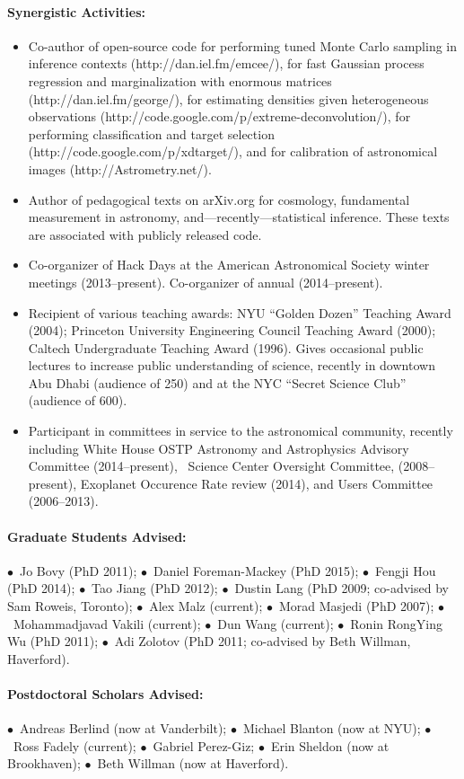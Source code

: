 \documentclass[12pt]{article}
\begin{document}
\paragraph{Synergistic Activities:}
\begin{itemize}\setlength{\itemsep}{0pt}
\item
Co-author of open-source code
for performing tuned Monte Carlo sampling in inference contexts (http://dan.iel.fm/emcee/),
for fast Gaussian process regression and marginalization with enormous matrices (http://dan.iel.fm/george/),
for estimating densities given heterogeneous observations (http://code.google.com/p/extreme-deconvolution/),
for performing classification and target selection (http://code.google.com/p/xdtarget/),
and
for calibration of astronomical images (http://Astrometry.net/).
\item
Author of pedagogical texts on arXiv.org for cosmology, fundamental
measurement in astronomy, and---recently---statistical inference.
These texts are associated with publicly released code.
\item
Co-organizer of Hack Days at the American Astronomical Society winter meetings (2013--present).
Co-organizer of annual  (2014--present).
\item
Recipient of various teaching awards: 
NYU ``Golden Dozen'' Teaching Award (2004);
Princeton University Engineering Council Teaching Award (2000);
Caltech Undergraduate Teaching Award (1996).
Gives occasional public lectures to increase public understanding of
science, recently in downtown Abu Dhabi (audience of 250) and at
the NYC ``Secret Science Club'' (audience of 600).
\item
Participant in committees in service to the astronomical community,
recently including
White House OSTP Astronomy and Astrophysics Advisory Committee (2014--present),
\Spitzer\ Science Center Oversight Committee, (2008--present),
 Exoplanet Occurence Rate review (2014),
and
 Users Committee (2006--2013).
\end{itemize}

\paragraph{Graduate Students Advised:}
$\bullet$~Jo Bovy (PhD 2011);
$\bullet$~Daniel Foreman-Mackey (PhD 2015);
$\bullet$~Fengji Hou (PhD 2014);
$\bullet$~Tao Jiang (PhD 2012);
$\bullet$~Dustin Lang (PhD 2009; co-advised by Sam Roweis, Toronto);
$\bullet$~Alex Malz (current);
$\bullet$~Morad Masjedi (PhD 2007);
$\bullet$~Mohammadjavad Vakili (current);
$\bullet$~Dun Wang (current);
$\bullet$~Ronin RongYing Wu (PhD 2011);
$\bullet$~Adi Zolotov (PhD 2011; co-advised by Beth Willman, Haverford).

\paragraph{Postdoctoral Scholars Advised:}
$\bullet$~Andreas Berlind (now at Vanderbilt);
$\bullet$~Michael Blanton (now at NYU);
$\bullet$~Ross Fadely (current);
$\bullet$~Gabriel Perez-Giz;
$\bullet$~Erin Sheldon (now at Brookhaven);
$\bullet$~Beth Willman (now at Haverford).
\end{document}
